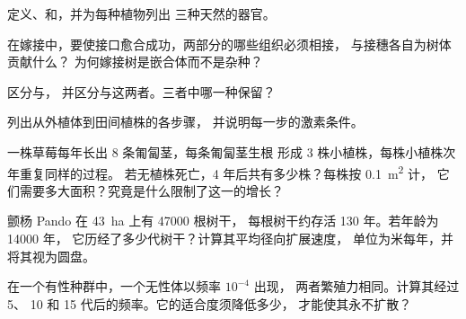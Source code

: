 \begin{exercise}[$\star$]\label{exo:b2:asexual-reproduction:1}
定义、和，并为每种植物列出
三种天然的器官。
\end{exercise}

\begin{exercise}[$\star$]\label{exo:b2:asexual-reproduction:2}
在嫁接中，要使接口愈合成功，两部分的哪些组织必须相接，
与接穗各自为树体贡献什么？
为何嫁接树是嵌合体而不是杂种？
\end{exercise}

\begin{exercise}[$\star$]\label{exo:b2:asexual-reproduction:3}
区分与，
并区分与这两者。三者中哪一种保留？
\end{exercise}

\begin{exercise}[$\star$]\label{exo:b2:asexual-reproduction:4}
列出从外植体到田间植株的各步骤，
并说明每一步的激素条件。
\end{exercise}

\begin{exercise}[$\star\star$]\label{exo:b2:asexual-reproduction:5}
一株草莓每年长出 8 条匍匐茎，每条匍匐茎生根
形成 3 株小植株，每株小植株次年重复同样的过程。
若无植株死亡，4 年后共有多少株？每株按 \qty{0.1}{m^2} 计，
它们需要多大面积？究竟是什么限制了这一的增长？
\end{exercise}

\begin{exercise}[$\star\star$]\label{exo:b2:asexual-reproduction:6}
颤杨 Pando 在 \qty{43}{ha} 上有 \num{47000} 根树干，
每根树干约存活 \num{130} 年。若年龄为 \num{14000} 年，
它历经了多少代树干？计算其平均径向扩展速度，
单位为米每年，并将其视为圆盘。
\end{exercise}

\begin{exercise}[$\star\star$]\label{exo:b2:asexual-reproduction:7}
在一个有性种群中，一个无性体以频率 $10^{-4}$ 出现，
两者繁殖力相同。计算其经过 5、
10 和 15 代后的频率。它的适合度须降低多少，
才能使其永不扩散？
\end{exercise}


